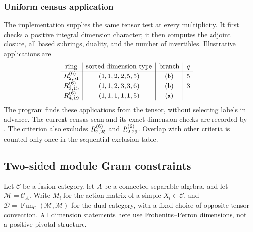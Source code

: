 \subsubsection{Uniform census application}
The implementation supplies the same tensor test at every multiplicity.
It first checks a positive integral dimension character; it then
computes the adjoint closure, all based subrings, duality, and the number
of invertibles. Illustrative applications are
\[
\begin{array}{c|c|c|c}
 \text{ring}&\text{sorted dimension type}&\text{branch}&q\\\hline
 R^{(6)}_{2,51}&(1,1,2,2,5,5)&\text{(b)}&5\\
 R^{(6)}_{3,15}&(1,1,2,3,3,6)&\text{(b)}&3\\
 R^{(6)}_{4,19}&(1,1,1,1,1,5)&\text{(a)}&\text{--}
\end{array}
\]
The program finds these applications from the tensor, without selecting
labels in advance. The current census scan and its exact dimension
checks are recorded by .
The criterion also excludes $R^{(6)}_{2,25}$ and $R^{(6)}_{2,29}$.
Overlap with other criteria is counted only once in the sequential
exclusion table.

\subsection{Two-sided module Gram constraints}\label{sec:dual-module-gram}
Let $\mathcal C$ be a fusion category, let $A$ be a connected separable algebra,
and let $\mathcal M=\mathcal C_A$. Write $M_i$ for the action matrix of a
simple $X_i\in\mathcal C$, and $\mathcal D=\operatorname{Fun}_{\mathcal C}
(\mathcal M,\mathcal M)$ for the dual category, with a fixed choice of
opposite tensor convention. All dimension statements here use
Frobenius--Perron dimensions, not a positive pivotal structure.

